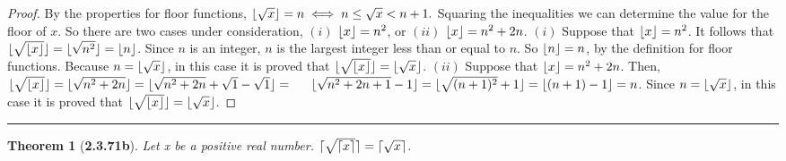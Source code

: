 \documentclass[a4paper, 12pt]{article}
\theoremstyle{plain}
\newtheorem*{theorem*}{Theorem}
\DeclarePairedDelimiter{\floor}{\lfloor}{\rfloor}
\DeclarePairedDelimiter{\ceil}{\lceil}{\rceil}
\begin{document}
\begin{proof}
    By the properties for floor functions, \newline 
    $\floor{\sqrt{x}} = n \iff n \le \sqrt{x} < n + 1.$ Squaring the inequalities we can 
    determine the value for the floor of $x$. So there are two cases under consideration, 
    \newline $(i)$ $\floor{x} = n^2$, or $(ii)$ $\floor{x} = n^{2} + 2n$.
    \newline
    \newline \indent
    $(i)$ Suppose that $\floor{x} = n^{2}$. It follows that 
    $\floor{\sqrt{\floor{x}}} = \floor{\sqrt{n^2}} = \floor{n}$. \indent Since $n$ is an 
    integer, $n$ is the largest integer less than or equal to $n$. So \indent 
    $\floor{n} = n$, by the definition for floor functions. Because $n = \floor{\sqrt{x}}$, 
    in this \indent case it is proved that $\floor{\sqrt{\floor{x}}} = \floor{\sqrt{x}}$.
    \newline
    \newline \indent
    $(ii)$ Suppose that $\floor{x} = n^{2} + 2n$. Then, \newline \indent 
    $\floor{\sqrt{\floor{x}}} = \floor{\sqrt{n^{2} + 2n}} = 
    \floor{\sqrt{n^2 + 2n} + \sqrt{1} - \sqrt{1}} = \newline \indent 
    \floor{\sqrt{n^2 + 2n + 1} - 1} = \floor{\sqrt{(n+1)^2} + 1} = \floor{(n+1) -1} = n$. 
    Since \indent $n = \floor{\sqrt{x}}$, in this case it is proved that 
    $\floor{\sqrt{\floor{x}}} = \floor{\sqrt{x}}$.
\end{proof}
\begin{center}
    \rule{5.4in}{1pt}
\end{center}


\begin{theorem*}[\textbf{2.3.71b}]
    Let x be a positive real number. $\ceil{\sqrt{\ceil{x}}} = \ceil{\sqrt{x}}$.
\end{theorem*}
\end{document}
